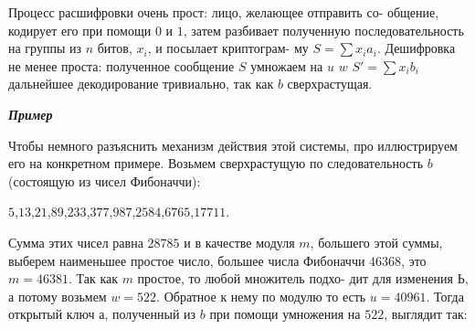 \documentclass{../template/mai_book}
\begin{document}
Процесс расшифровки очень прост: лицо, желающее отправить со­-\linebreak
общение, кодирует его при помощи $0$ и $1$, затем разбивает полученную\linebreak
последовательность на группы из $n$ битов, $x_i$, и посылает криптограм-\linebreak­
му $S = \sum x_i a_i$. Дешифровка не менее проста: полученное сообщение\linebreak
$S$ умножаем на $u$ $w$ $S' = \sum x_i b_i$
дальнейшее декодирование тривиально, так как $b$ сверхрастущая.

\noindent\textbf{\textit{Пример}}

Чтобы немного разъяснить механизм действия этой системы, про­
иллюстрируем его на конкретном примере. Возьмем сверхрастущую по­
следовательность $b$ (состоящую из чисел Фибоначчи):

\begin{center}
$5$,\;\;\;\;\;$13$,\;\;\;\;\;$21$,\;\;\;\;\;$89$,\;\;\;\;\;$233$,\;\;\;\;\;$377$,\;\;\;\;\;$987$,\;\;\;\;\;$2 584$,\;\;\;\;\;$6 765$,\;\;\;\;\;$17 711$.
\end{center}

\noindent Сумма этих чисел равна $28 785$ и в качестве модуля $m$, большего этой\linebreak
суммы, выберем наименьшее простое число, большее числа Фибоначчи\linebreak
$46368$, это $m = 46381$. Так как $m$ простое, то любой множитель подхо­-\linebreak
дит для изменения $Ь$, а потому возьмем $w = 522$. Обратное к нему по\linebreak
модулю то есть $u = 40961$. Тогда открытый ключ $а$, полученный из $b$\linebreak
при помощи умножения на $522$, выглядит так:
\end{document}
